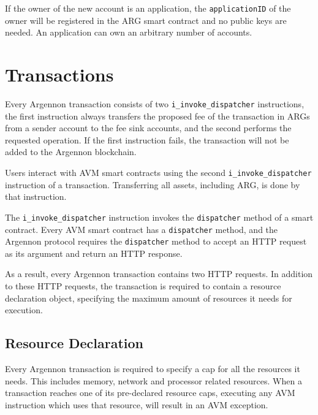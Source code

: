 If the owner of the new account is an application, the \texttt{applicationID} of the owner will be registered in the
ARG smart contract and no public keys are needed. An application can own an arbitrary number of accounts.



\section{Transactions}\label{sec:transactions}

Every Argennon transaction consists of two \texttt{i\_invoke\_dispatcher} instructions, the first instruction always
transfers the proposed fee of the transaction in ARGs from a sender account to the fee sink accounts, and
the second performs the requested operation. If the first instruction fails, the transaction will not be added to
the Argennon blockchain.

Users interact with AVM smart contracts using
the second \texttt{i\_invoke\_dispatcher} instruction of a transaction.
Transferring all assets, including ARG, is done by that instruction.

The \texttt{i\_invoke\_dispatcher} instruction invokes the \texttt{dispatcher} method of a smart contract. Every AVM
smart contract has a \texttt{dispatcher} method, and the Argennon protocol requires
the \texttt{dispatcher} method to accept an HTTP request as its argument and
return an HTTP response.

As a result, every Argennon transaction contains two HTTP requests. In addition to these HTTP requests, the
transaction is required to contain a resource declaration object, specifying the maximum amount of resources
it needs for execution.


\subsection{Resource Declaration}\label{subsec:resource-declaration}

Every Argennon transaction is required to specify a cap for all the resources it needs. This
includes memory, network and processor related resources. When a transaction reaches one of its
pre-declared resource caps, executing any AVM instruction which uses that resource, will result in an AVM exception.

